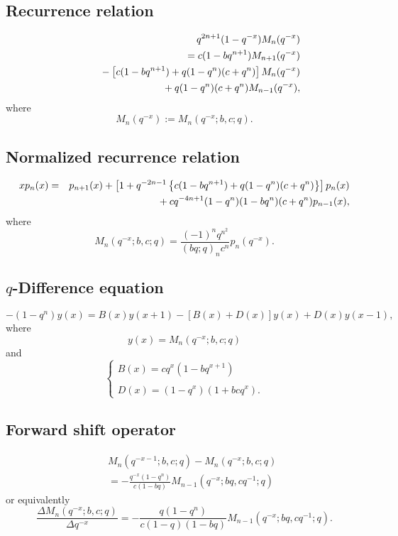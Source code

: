 \documentclass[envcountchap,graybox]{svmono}
\newcommand{\mathindent}{\hspace{7.5mm}}
\begin{document}
\subsection*{Recurrence relation}
\begin{eqnarray}
\label{RecqMeixner}
& &q^{2n+1}(1-q^{-x})M_n(q^{-x})\nonumber\\
& &{}=c(1-bq^{n+1})M_{n+1}(q^{-x})\nonumber\\
& &{}\mathindent{}-\left[c(1-bq^{n+1})+q(1-q^n)(c+q^n)\right]M_n(q^{-x})\nonumber\\
& &{}\mathindent\mathindent{}+q(1-q^n)(c+q^n)M_{n-1}(q^{-x}),
\end{eqnarray}
where
$$M_n(q^{-x}):=M_n(q^{-x};b,c;q).$$

\subsection*{Normalized recurrence relation}
\begin{eqnarray}
\label{NormRecqMeixner}
xp_n(x)&=&p_{n+1}(x)+
\left[1+q^{-2n-1}\left\{c(1-bq^{n+1})+q(1-q^n)(c+q^n)\right\}\right]p_n(x)\nonumber\\
& &{}\mathindent{}+cq^{-4n+1}(1-q^n)(1-bq^n)(c+q^n)p_{n-1}(x),
\end{eqnarray}
where
$$M_n(q^{-x};b,c;q)=\frac{(-1)^nq^{n^2}}{(bq;q)_nc^n}p_n(q^{-x}).$$

\subsection*{$q$-Difference equation}
\begin{equation}
\label{dvqMeixner}
-(1-q^n)y(x)=B(x)y(x+1)-\left[B(x)+D(x)\right]y(x)+D(x)y(x-1),
\end{equation}
where
$$y(x)=M_n(q^{-x};b,c;q)$$
and
$$\left\{\begin{array}{l}\displaystyle B(x)=cq^x(1-bq^{x+1})\\
\\
\displaystyle D(x)=(1-q^x)(1+bcq^x).\end{array}\right.$$

\subsection*{Forward shift operator}
\begin{eqnarray}
\label{shift1qMeixnerI}
& &M_n(q^{-x-1};b,c;q)-M_n(q^{-x};b,c;q)\nonumber\\
& &{}=-\frac{q^{-x}(1-q^n)}{c(1-bq)}M_{n-1}(q^{-x};bq,cq^{-1};q)
\end{eqnarray}
or equivalently
\begin{equation}
\label{shift1qMeixnerII}
\frac{\Delta M_n(q^{-x};b,c;q)}{\Delta q^{-x}}
=-\frac{q(1-q^n)}{c(1-q)(1-bq)}M_{n-1}(q^{-x};bq,cq^{-1};q).
\end{equation}
\end{document}
